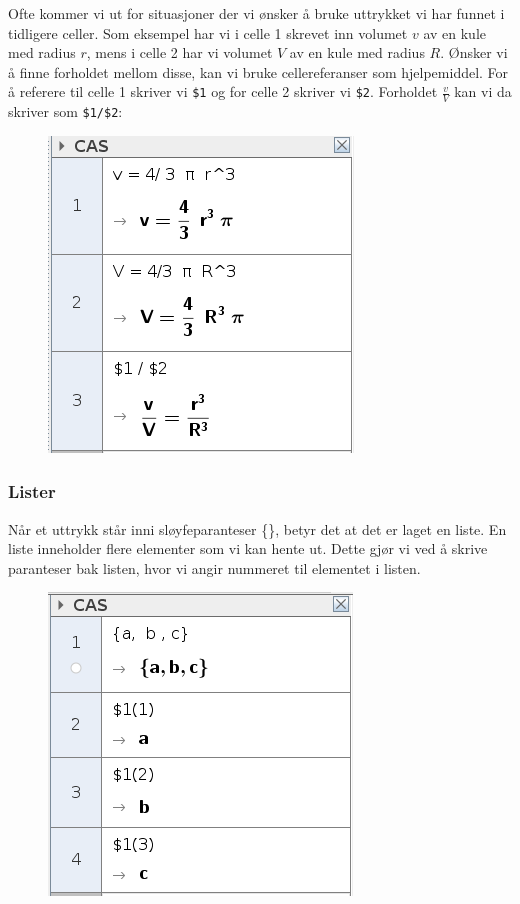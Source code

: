 Ofte kommer vi ut for situasjoner der vi ønsker å bruke uttrykket vi har funnet i tidligere celler. Som eksempel har vi i celle 1 skrevet inn volumet $ v $ av en kule med radius $ r $, mens i celle 2 har vi volumet $ V $ av en kule med radius $ R $. Ønsker vi å finne forholdet mellom disse, kan vi bruke cellereferanser som hjelpemiddel. For å referere til celle 1 skriver vi \texttt{\$1} og for celle 2 skriver vi \texttt{\$2}. Forholdet $ \frac{v}{V} $ kan vi da skriver som \texttt{\$1/\$2}:
\begin{figure}
	\centering
	\includegraphics[scale=0.5]{fig/ref}
\end{figure}

\subsubsection{Lister}
Når et uttrykk står inni sløyfeparanteser \{\}, betyr det at det er laget en liste. En liste inneholder flere elementer som vi kan hente ut. Dette gjør vi ved å skrive paranteser bak listen, hvor vi angir nummeret til elementet i listen.
\begin{figure}
	\centering
	\includegraphics[scale=0.5]{fig/liste}
\end{figure}

